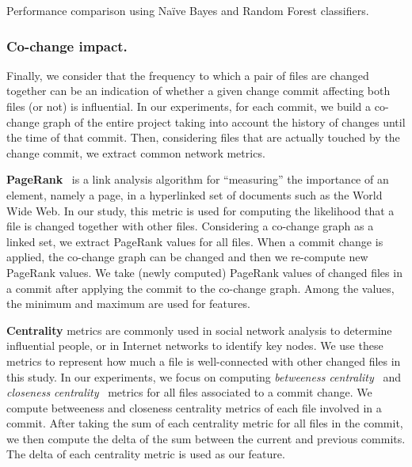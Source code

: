 

\begin{table}[!t]
    \caption{Performance comparison using Na\"{i}ve Bayes and Random Forest classifiers.}
    \label{tab:f-measure}
    
\end{table}

\subsubsection{Co-change impact.}
Finally, we consider that the frequency to which a pair of files are changed
together can be an indication of whether a given change commit affecting both
files (or not) is influential.
In our experiments, for each commit, we build a co-change graph of the entire
project taking into account the history of changes until the time of that
commit. Then, considering files that are actually touched by the
change commit, we extract common network metrics.


\textbf{PageRank}~\cite{Brin98} is a link analysis algorithm for ``measuring'' the importance of
an element, namely a page, in a hyperlinked set of documents such as the World Wide Web. In our study, this metric is used for computing the likelihood that a file is changed together with other files.
Considering a co-change graph as a linked set, we extract PageRank values for all files. When a commit change is
applied, the co-change graph can be changed and then we re-compute new PageRank values. We take (newly computed) PageRank values of changed files in a commit after applying the commit to the co-change graph. Among the values, the minimum and maximum are used for features.


\textbf{Centrality} metrics are commonly used in social network analysis to determine influential people,
or in Internet networks to identify key nodes. We use these metrics to represent how much a file is well-connected with other changed files in this study. 
In our experiments, we focus on computing 
{\em betweeness centrality}~\cite{freeman07}
and {\em closeness centrality}~\cite{Sabidussi66} metrics for all files associated to a commit change.
We compute betweeness and closeness centrality metrics of each file involved in a commit. After taking the sum of each centrality metric for all files in the commit, 
we then compute the delta of the sum between the current and previous commits. 
The delta of each centrality metric is used as our feature.

